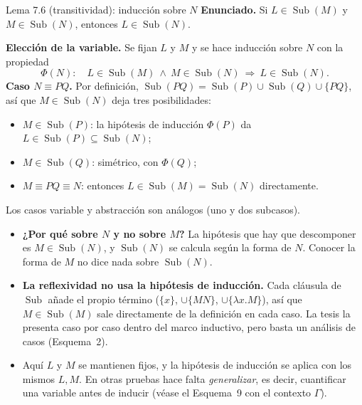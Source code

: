 \documentclass[11pt,a4paper]{article}
\newcommand{\Sub}{\operatorname{Sub}}
\begin{document}
\begin{ejemplotesis}{Lema 7.6 (transitividad): inducción sobre \(N\)}
\textbf{Enunciado.} Si \(L\in\Sub(M)\) y \(M\in\Sub(N)\), entonces
\(L\in\Sub(N)\).

\textbf{Elección de la variable.} Se fijan \(L\) y \(M\) y se hace inducción
sobre \(N\) con la propiedad
\[
\Phi(N):\quad L\in\Sub(M)\ \wedge\ M\in\Sub(N)\ \Longrightarrow\ L\in\Sub(N).
\]
\textbf{Caso \(N\equiv PQ\).} Por definición,
\(\Sub(PQ)=\Sub(P)\cup\Sub(Q)\cup\{PQ\}\), así que \(M\in\Sub(N)\) deja tres
posibilidades:
\begin{itemize}
  \item \(M\in\Sub(P)\): la hipótesis de inducción \(\Phi(P)\) da
    \(L\in\Sub(P)\subseteq\Sub(N)\);
  \item \(M\in\Sub(Q)\): simétrico, con \(\Phi(Q)\);
  \item \(M\equiv PQ\equiv N\): entonces \(L\in\Sub(M)=\Sub(N)\) directamente.
\end{itemize}
Los casos variable y abstracción son análogos (uno y dos subcasos).
\end{ejemplotesis}

\begin{trampa}
\begin{itemize}
  \item \textbf{¿Por qué sobre \(N\) y no sobre \(M\)?} La hipótesis que hay
    que descomponer es \(M\in\Sub(N)\), y \(\Sub(N)\) se calcula según la
    forma de \(N\). Conocer la forma de \(M\) no dice nada sobre \(\Sub(N)\).
  \item \textbf{La reflexividad no usa la hipótesis de inducción.} Cada
    cláusula de \(\Sub\) añade el propio término (\(\{x\}\), \(\cup\{MN\}\),
    \(\cup\{\lambda x.M\}\)), así que \(M\in\Sub(M)\) sale directamente de la
    definición en cada caso. La tesis la presenta caso por caso dentro del
    marco inductivo, pero basta un análisis de casos (Esquema~2).
  \item Aquí \(L\) y \(M\) se mantienen fijos, y la hipótesis de inducción se
    aplica con los mismos \(L,M\). En otras pruebas hace falta
    \emph{generalizar}, es decir, cuantificar una variable antes de inducir
    (véase el Esquema~9 con el contexto \(\Gamma\)).
\end{itemize}
\end{trampa}
\end{document}
